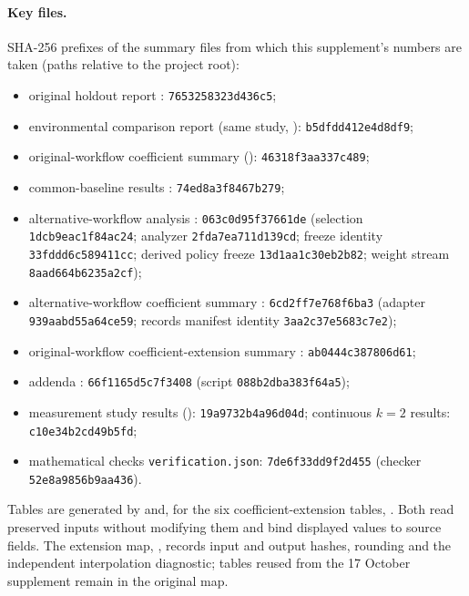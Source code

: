 \paragraph{Key files.} SHA-256 prefixes of the summary files from which this
supplement's numbers are taken (paths relative to the project root):
\begin{itemize}\small\raggedright
\item original holdout report : \texttt{7653258323d436c5};
\item environmental comparison report (same study, ): \texttt{b5dfdd412e4d8df9};
\item original-workflow coefficient summary (): \texttt{46318f3aa337c489};
\item common-baseline results : \texttt{74ed8a3f8467b279};
\item alternative-workflow analysis : \texttt{063c0d95f37661de} (selection \texttt{1dcb9eac1f84ac24}; analyzer \texttt{2fda7ea711d139cd}; freeze identity \texttt{33fddd6c589411cc}; derived policy freeze \texttt{13d1aa1c30eb2b82}; weight stream \texttt{8aad664b6235a2cf});
\item alternative-workflow coefficient summary : \texttt{6cd2ff7e768f6ba3} (adapter \texttt{939aabd55a64ce59}; records manifest identity \texttt{3aa2c37e5683c7e2});
\item original-workflow coefficient-extension summary : \texttt{ab0444c387806d61};
\item addenda : \texttt{66f1165d5c7f3408} (script \texttt{088b2dba383f64a5});
\item measurement study results (): \texttt{19a9732b4a96d04d}; continuous $k=2$ results: \texttt{c10e34b2cd49b5fd};
\item mathematical checks \texttt{verification.json}: \texttt{7de6f33dd9f2d455} (checker \texttt{52e8a9856b9aa436}).
\end{itemize}
Tables are generated by 
and, for the six coefficient-extension tables,
. Both read preserved inputs
without modifying them and bind displayed values to source fields. The extension
map, , records input
and output hashes, rounding and the independent interpolation diagnostic;
tables reused from the 17 October supplement remain in the original map.

